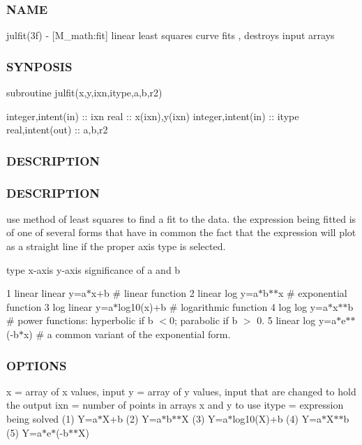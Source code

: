 \subsubsection*{N\+A\+ME}

julfit(3f) -\/ \mbox{[}M\+\_\+math\+:fit\mbox{]} linear least squares curve fits , destroys input arrays 

\subsubsection*{S\+Y\+N\+P\+O\+S\+IS}

subroutine julfit(x,y,ixn,itype,a,b,r2)

integer,intent(in) \+:\+: ixn real \+:\+: x(ixn),y(ixn) integer,intent(in) \+:\+: itype real,intent(out) \+:\+: a,b,r2

\subsubsection*{D\+E\+S\+C\+R\+I\+P\+T\+I\+ON}

\subsubsection*{D\+E\+S\+C\+R\+I\+P\+T\+I\+ON}

use method of least squares to find a fit to the data. the expression being fitted is of one of several forms that have in common the fact that the expression will plot as a straight line if the proper axis type is selected.

type x-\/axis y-\/axis significance of a and b

1 linear linear y=a$\ast$x+b \# linear function 2 linear log y=a$\ast$b$\ast$$\ast$x \# exponential function 3 log linear y=a$\ast$log10(x)+b \# logarithmic function 4 log log y=a$\ast$x$\ast$$\ast$b \# power functions\+: hyperbolic if b $<$0; parabolic if b $>$ 0. 5 linear log y=a$\ast$e$\ast$$\ast$(-\/b$\ast$x) \# a common variant of the exponential form.

\subsubsection*{O\+P\+T\+I\+O\+NS}

x = array of x values, input y = array of y values, input that are changed to hold the output ixn = number of points in arrays x and y to use itype = expression being solved (1) Y=a$\ast$\+X+b (2) Y=a$\ast$b$\ast$$\ast$X (3) Y=a$\ast$log10(X)+b (4) Y=a$\ast$\+X$\ast$$\ast$b (5) Y=a$\ast$e$\ast$(-\/b$\ast$$\ast$X)

